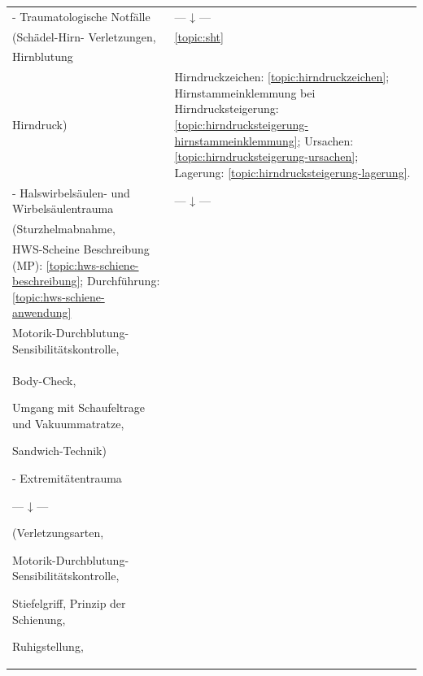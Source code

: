 \begin{xtabular}{p{10cm}p{5cm}}
\\\midrule

- Traumatologische Notfälle
& 
--- ↓ --- 
\\ 
(Schädel-Hirn- Verletzungen,          
& 
\ref{topic:sht}
\\
Hirnblutung 
& 
\noindent{}
\\
Hirndruck) 
& 
Hirndruckzeichen: \ref{topic:hirndruckzeichen}; Hirnstammeinklemmung bei
Hirndrucksteigerung: \ref{topic:hirndrucksteigerung-hirnstammeinklemmung}; Ursachen:
\ref{topic:hirndrucksteigerung-ursachen}; Lagerung: \ref{topic:hirndrucksteigerung-lagerung}.
\\
- Halswirbelsäulen- und  Wirbelsäulentrauma     
& 
--- ↓ --- 
\\
(Sturzhelmabnahme,      
& 
\noindent{}
\\
HWS-Scheine Beschreibung (MP): \ref{topic:hws-schiene-beschreibung};
Durchführung: \ref{topic:hws-schiene-anwendung} 
& 
\noindent{}
\\
Motorik-Durchblutung-Sensibilitätskontrolle,         
& 
\noindent{}
\\
Body-Check, 

Umgang mit  Schaufeltrage und Vakuummatratze,

Sandwich-Technik)

- Extremitätentrauma

--- ↓ --- 

(Verletzungsarten,

Motorik-Durchblutung-Sensibilitätskontrolle,

Stiefelgriff, Prinzip der Schienung,

Ruhigstellung,


\end{xtabular}
